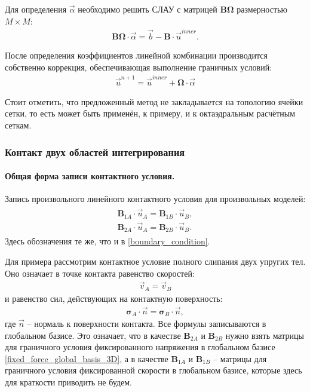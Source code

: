 \documentclass[a4paper]{article}
\numberwithin{equation}{section}
\begin{document}
Для определения $\vec{\alpha}$ необходимо решить 
СЛАУ с матрицей $\mathbf{B} \mathbf{\Omega}$ размерностью $M \times M$:
\begin{eqnarray}
\label{SLE_on_alpha}
	\mathbf{B} \mathbf{\Omega} \cdot \vec{\alpha} = \vec{b} - \mathbf{B} \cdot \vec{u}^{inner}.
\end{eqnarray}

После определения коэффициентов линейной комбинации производится собственно коррекция,
обеспечивающая выполнение граничных условий:
\begin{eqnarray}
\vec{u}^{n+1} = \vec{u}^{inner} + \mathbf{\Omega} \cdot \vec{\alpha}
\end{eqnarray}

Стоит отметить, что предложенный метод 
не закладывается на топологию ячейки сетки, то есть может быть применён, 
к примеру, и к октаэдральным расчётным сеткам.


\subsubsection{Контакт двух областей интегрирования}
\paragraph{Общая форма записи контактного условия.}
Запись произвольного линейного контактного условия для произвольных моделей:
\begin{eqnarray}
\label{contact_condition}
\begin{split}
	\mathbf{B}_{1A} \cdot \vec{u}_A = \mathbf{B}_{1B} \cdot \vec{u}_B, \\
	\mathbf{B}_{2A} \cdot \vec{u}_A = \mathbf{B}_{2B} \cdot \vec{u}_B.
\end{split}
\end{eqnarray}
Здесь обозначения те же, что и в \eqref{boundary_condition}.

Для примера рассмотрим контактное условие полного слипания двух упругих тел.
Оно означает в точке контакта равенство скоростей:
\begin{eqnarray}
\vec{v}_A = \vec{v}_B
\end{eqnarray}
и равенство сил, действующих на контактную поверхность:
\begin{eqnarray}
\mathbf{\sigma}_A \cdot \vec{n} = \mathbf{\sigma}_B \cdot \vec{n},
\end{eqnarray}
где $\vec{n}$ -- нормаль к поверхности контакта. 
Все формулы записываются в глобальном базисе. 
Это означает, что в качестве $\mathbf{B}_{2A}$ и $\mathbf{B}_{2B}$ 
нужно взять матрицы для граничного условия фиксированного напряжения в глобальном базисе 
\eqref{fixed_force_global_basis_3D}, а в качестве 
$\mathbf{B}_{1A}$ и $\mathbf{B}_{1B}$ -- матрицы для граничного условия 
фиксированной скорости в глобальном базисе, 
которые здесь для краткости приводить не будем.
\end{document}
